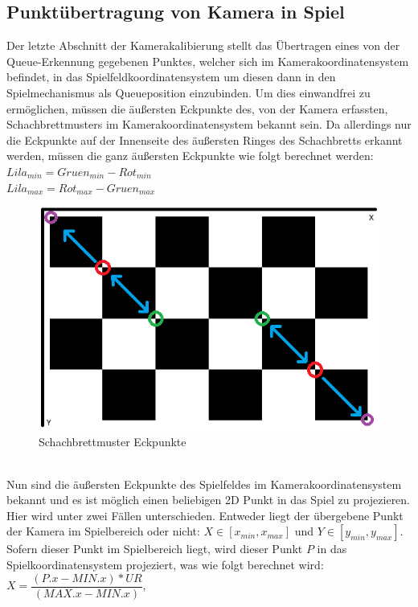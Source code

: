 \subsection{Punktübertragung von Kamera in Spiel}
Der letzte Abschnitt der Kamerakalibierung stellt das Übertragen eines von der Queue-Erkennung gegebenen Punktes, welcher sich im Kamerakoordinatensystem befindet, in das Spielfeldkoordinatensystem um diesen dann in den Spielmechanismus als Queueposition einzubinden.
Um dies einwandfrei zu ermöglichen, müssen die äußersten Eckpunkte des, von der Kamera erfassten, Schachbrettmusters im Kamerakoordinatensystem bekannt sein. Da allerdings nur die Eckpunkte auf der Innenseite des äußersten Ringes des Schachbretts erkannt werden, müssen die ganz äußersten Eckpunkte wie folgt berechnet werden:\\
$Lila_{min} = Gruen_{min} - Rot_{min}$\\
$Lila_{max} = Rot_{max} - Gruen_{max}$
\begin{figure}[h]
	\label{fig:chessboard}
	\centering
	\includegraphics[scale=0.8]{bilder/schachbrettdiff.png}
	\caption{Schachbrettmuster Eckpunkte}
\end{figure}\\
Nun sind die äußersten Eckpunkte des Spielfeldes im Kamerakoordinatensystem bekannt und es ist möglich einen beliebigen 2D Punkt in das Spiel zu projezieren. Hier wird unter zwei Fällen unterschieden. Entweder liegt der übergebene Punkt der Kamera im Spielbereich oder nicht: $X \in [x_{min}, x_{max}]$ und $Y \in [y_{min},y_{max}]$.
Sofern dieser Punkt im Spielbereich liegt, wird dieser Punkt $P$ in das Spielkoordinatensystem projeziert, was wie folgt berechnet wird:\\
$X = \dfrac{(P.x - MIN.x) * UR}{(MAX.x - MIN.x)}$, 
